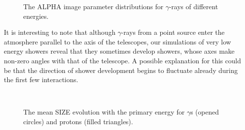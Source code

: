 \begin{figure}[h]
 \begin{center}
  \caption{The ALPHA image parameter distributions for $\gamma$-rays of different
energies.}
  \label{galpha:fig}
 \end{center}
\end{figure}

It is interesting to note that although $\gamma$-rays from a point source
enter the atmosphere parallel to the axis of the telescopes, our
simulations of very low energy showers reveal that they sometimes
develop showers, whose axes make  non-zero angles with that
of the telescope. A possible explanation for this could be 
that the direction of shower development begins
to fluctuate already during the first few interactions.
%

\begin{figure}[h]
 \begin{center}
  \\
  \caption{The mean SIZE evolution with the primary energy for
$\gamma$s (opened circles) and protons (filled triangles).}
  \label{gpsizes:fig}
 \end{center}
\end{figure}


